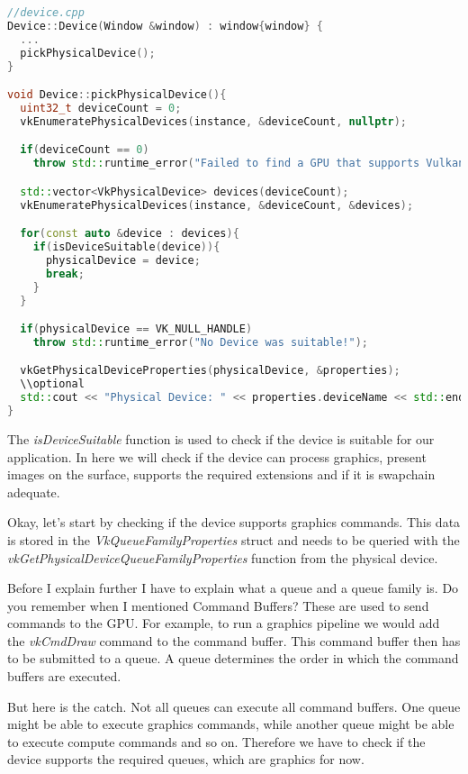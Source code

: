 \documentclass[12pt]{report} \usepackage{preamble}
\begin{document}
\begin{lstlisting}[language=C++]
//device.cpp
Device::Device(Window &window) : window{window} {
  ...
  pickPhysicalDevice();
}

void Device::pickPhysicalDevice(){
  uint32_t deviceCount = 0;
  vkEnumeratePhysicalDevices(instance, &deviceCount, nullptr);

  if(deviceCount == 0)
    throw std::runtime_error("Failed to find a GPU that supports Vulkan!");

  std::vector<VkPhysicalDevice> devices(deviceCount);
  vkEnumeratePhysicalDevices(instance, &deviceCount, &devices);

  for(const auto &device : devices){
    if(isDeviceSuitable(device)){
      physicalDevice = device;
      break;
    }
  }

  if(physicalDevice == VK_NULL_HANDLE)
    throw std::runtime_error("No Device was suitable!");

  vkGetPhysicalDeviceProperties(physicalDevice, &properties);
  \\optional
  std::cout << "Physical Device: " << properties.deviceName << std::endl;
}
\end{lstlisting}

The \textit{isDeviceSuitable} function is used to check if the device is suitable for our application.
In here we will check if the device can process graphics, present images on the surface, supports the required extensions
and if it is swapchain adequate.

Okay, let's start by checking if the device supports graphics commands. This data is stored in
the \textit{VkQueueFamilyProperties} struct and needs to be queried with the \textit{vkGetPhysicalDeviceQueueFamilyProperties}
function from the physical device.

Before I explain further I have to explain what a queue and a queue family is. Do you remember
when I mentioned Command Buffers? These are used to send commands to the GPU. For example, to run a
graphics pipeline we would add the \textit{vkCmdDraw} command to the command buffer. This command
buffer then has to be submitted to a queue. A queue determines the order in which the command buffers
are executed.

But here is the catch. Not all queues can execute all command buffers. One queue might be able to
execute graphics commands, while another queue might be able to execute compute commands and so on.
Therefore we have to check if the device supports the required queues, which are graphics for now.
\end{document}
